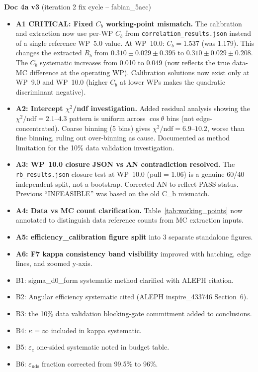 \documentclass[11pt,a4paper]{article}
\begin{document}
\textbf{Doc 4a v3} (iteration 2 fix cycle -- fabian\_5aec)
\begin{itemize}
\item \textbf{A1 CRITICAL: Fixed $C_b$ working-point mismatch.} The calibration and extraction
  now use per-WP $C_b$ from \texttt{correlation\_results.json} instead of a single reference WP~5.0 value.
  At WP~10.0: $C_b = 1.537$ (was 1.179). This changes the extracted $R_b$ from
  $0.310 \pm 0.029 \pm 0.395$ to $0.310 \pm 0.029 \pm 0.208$.
  The $C_b$ systematic increases from 0.010 to 0.049 (now reflects the true data-MC difference at the operating WP).
  Calibration solutions now exist only at WP~9.0 and WP~10.0 (higher $C_b$ at lower WPs makes the
  quadratic discriminant negative).
\item \textbf{A2: Intercept $\chi^2$/ndf investigation.} Added residual analysis showing the
  $\chi^2/\mathrm{ndf} = 2.1$--$4.3$ pattern is uniform across $\cos\theta$ bins (not edge-concentrated).
  Coarse binning (5 bins) gives $\chi^2/\mathrm{ndf} = 6.9$--$10.2$, worse than fine binning,
  ruling out over-binning as cause. Documented as method limitation for the 10\% data validation investigation.
\item \textbf{A3: WP~10.0 closure JSON vs AN contradiction resolved.} The \texttt{rb\_results.json}
  closure test at WP~10.0 (pull = 1.06) is a genuine 60/40 independent split, not a bootstrap.
  Corrected AN to reflect PASS status. Previous ``INFEASIBLE'' was based on the old C\_b mismatch.
\item \textbf{A4: Data vs MC count clarification.} Table~\ref{tab:working_points} now annotated
  to distinguish data reference counts from MC extraction inputs.
\item \textbf{A5: efficiency\_calibration figure split} into 3 separate standalone figures.
\item \textbf{A6: F7 kappa consistency band visibility} improved with hatching, edge lines, and zoomed y-axis.
\item B1: sigma\_d0\_form systematic method clarified with ALEPH citation.
\item B2: Angular efficiency systematic cited (ALEPH inspire\_433746 Section~6).
\item B3: the 10\% data validation blocking-gate commitment added to conclusions.
\item B4: $\kappa = \infty$ included in kappa systematic.
\item B5: $\varepsilon_c$ one-sided systematic noted in budget table.
\item B6: $\varepsilon_\mathrm{uds}$ fraction corrected from 99.5\% to 96\%.

\end{itemize}
\end{document}
